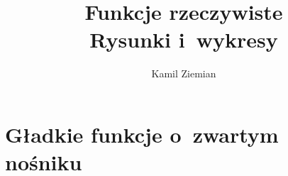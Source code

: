 \documentclass[a4paper,11pt]{article}
\title{Funkcje rzeczywiste \\
  {\Large Rysunki i~wykresy}}
\author{Kamil Ziemian}
\numberwithin{equation}{section}
\begin{document}





\maketitle





\section{Gładkie funkcje o~zwartym nośniku}

\label{sec:Funkcje-wykladnicze-i-logarytmiczne}
\end{document}
